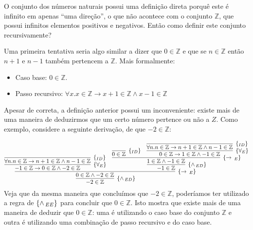 \begin{Example}
O conjunto dos números naturais possui uma definição direta porquê
este é infinito em apenas ``uma direção'', o que não acontece com o
conjunto $\mathbb{Z}$, que possui infinitos elementos positivos e negativos.
Então como definir este conjunto recursivamente?

Uma primeira tentativa seria algo similar a dizer que $0\in\mathbb{Z}$
e que se $n \in \mathbb{Z}$ então $n + 1$ e $n - 1$ também pertencem a
$\mathbb{Z}$. Mais formalmente:
\begin{itemize}
  \item Caso base: $0\in\mathbb{Z}$.
  \item Passo recursivo: $\forall x. x\in\mathbb{Z} \to x+1 \in
    \mathbb{Z} \land x - 1 \in\mathbb{Z}$
\end{itemize}

Apesar de correta, a definição anterior possui um inconveniente:
existe mais de uma maneira de deduzirmos que um certo número pertence
ou não a $Z$. Como exemplo, considere a seguinte derivação, de que
$-2\in\mathbb{Z}$:

\[
\infer[\andED]{-2\in\mathbb{Z}}
                    {
                      \infer[\impE]{0\in\mathbb{Z}\land -2
                        \in\mathbb{Z}}
                               {
                                 \infer[\forallE]{-1\in\mathbb{Z} \to
                                   0 \in\mathbb{Z} \land -2
                                   \in\mathbb{Z}}
                                   {\infer[\Id]{\forall n.n\in\mathbb{Z}\to n + 1
                                     \in\mathbb{Z}\land n - 1 \in
                                     \mathbb{Z}}{}}
                                    &
                                 \infer[\andED]{-1\in\mathbb{Z}}
                                           {
                                             \infer[\impE]{1\in\mathbb{Z}\land
                                             -1\in\mathbb{Z}}
                                               {
                                                 \infer[\Id]{0\in\mathbb{Z}}{}
                                                 &
                                                 \infer[\forallE]{0\in\mathbb{Z}\to
                                                 1 \in\mathbb{Z}\land
                                                 -1\in\mathbb{Z}}{
                                                 \infer[\Id]{\forall
                                               n. n\in\mathbb{Z}\to n
                                               + 1 \in \mathbb{Z}\land
                                             n - 1 \in\mathbb{Z}}{}}
                                               }
                                           }
                               }
                    }
\]
Veja que da mesma maneira que concluímos que $-2\in\mathbb{Z}$,
poderíamos ter utilizado a regra de $\scriptsize{\{\land\,_{EE}\}}$ para concluir que
$0\in\mathbb{Z}$. Isto mostra que existe mais de uma maneira de
deduzir que $0\in\mathbb{Z}$: uma é utilizando o caso base do conjunto
$\mathbb{Z}$ e outra é utilizando uma combinação de passo recursivo e
do caso base.


\end{Example}
